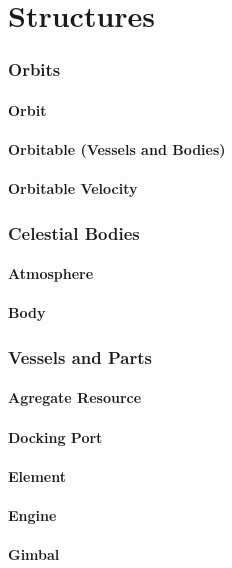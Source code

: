 \part{Structures}
	\section{Orbits}
		\subsection{Orbit}
		\subsection{Orbitable (Vessels and Bodies)}
		\subsection{Orbitable Velocity}
	\section{Celestial Bodies}
		\subsection{Atmosphere}
		\subsection{Body}
	\section{Vessels and Parts}
		\subsection{Agregate Resource}
		\subsection{Docking Port}
		\subsection{Element}
		\subsection{Engine}
		\subsection{Gimbal}
